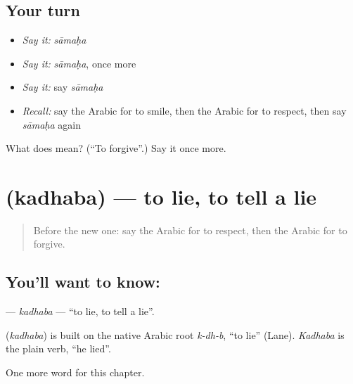 \subsection*{Your turn}
\begin{itemize}
\raggedright
  \item \emph{Say it:} \emph{sāmaḥa}
  \item \emph{Say it:} \emph{sāmaḥa}, once more
  \item \emph{Say it:} say \emph{sāmaḥa}
  \item \emph{Recall:} say the Arabic for to smile, then the Arabic for to respect, then say \emph{sāmaḥa} again
\end{itemize}

\begin{tcolorbox}[breakable,colback=teal!4,colframe=teal!35!black,title={Before you move on}]
What does  mean? (\textquotedblleft{}To forgive\textquotedblright{}.) Say it once more.
\end{tcolorbox}
\section[\texorpdfstring{\ar{كذب} (kadhaba)}{كذب (kadhaba)}]{ (kadhaba) — to lie, to tell a lie}

\label{lesson:AR-C258-kadhaba}



\begin{quote}
Before the new one: say the Arabic for to respect, then the Arabic for to forgive.
\end{quote}

\subsection*{You'll want to know: }
\textbf{} — \emph{kadhaba} — \textquotedblleft{}to lie, to tell a lie\textquotedblright{}.

\begin{cousinweb}
\textbf{} (\emph{kadhaba}) is built on the native Arabic root \emph{k-dh-b}, \textquotedblleft{}to lie\textquotedblright{} (Lane). \emph{Kadhaba} is the plain verb, \textquotedblleft{}he lied\textquotedblright{}.
\end{cousinweb}

\begin{grammarlens}[title={What you've built}]
One more word for this chapter.
\end{grammarlens}

